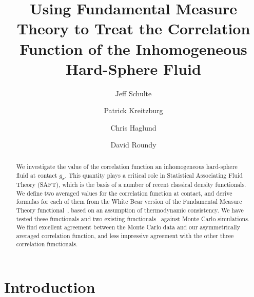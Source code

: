 \documentclass[letterpaper,twocolumn,amsmath,amssymb,jcp,10pt,aip]{revtex4-1}
\begin{document}
\title{Using Fundamental Measure Theory to Treat the Correlation
  Function of the Inhomogeneous Hard-Sphere Fluid}

\author{Jeff Schulte}
\author{Patrick Kreitzburg}
\author{Chris Haglund}
\author{David Roundy}


\begin{abstract}
  We investigate the value of the correlation function an
  inhomogeneous hard-sphere fluid at contact $g_\sigma$.  This
  quantity plays a critical role in Statistical Associating Fluid
  Theory (SAFT), which is the basis of a number of recent classical
  density functionals.  We define two averaged values for the
  correlation function at contact, and derive formulas for each of
  them from the White Bear version of the Fundamental Measure Theory
  functional~\cite{roth2002whitebear}, based on an assumption of
  thermodynamic consistency. We have tested these functionals and two
  existing functionals~\cite{yu2002fmt-dft-inhomogeneous-associating,
    gross2009density} against Monte Carlo simulations.  We find
  excellent agreement between the Monte Carlo data and our
  asymmetrically averaged correlation function, and less impressive
  agreement with the other three correlation functionals.
\end{abstract}

\maketitle

\section{Introduction}

\newcommand\saftlocaldft{felipe2001examination, gloor2002saft,%
  gloor2004accurate, clark2006developing, gloor2007prediction,%
  kahl2008modified, gross2009density}
\newcommand\saftnonlocaldft{yu2002fmt-dft-inhomogeneous-associating,%
  fu2005vapor-liquid-dft,bryk2006density}
\end{document}
